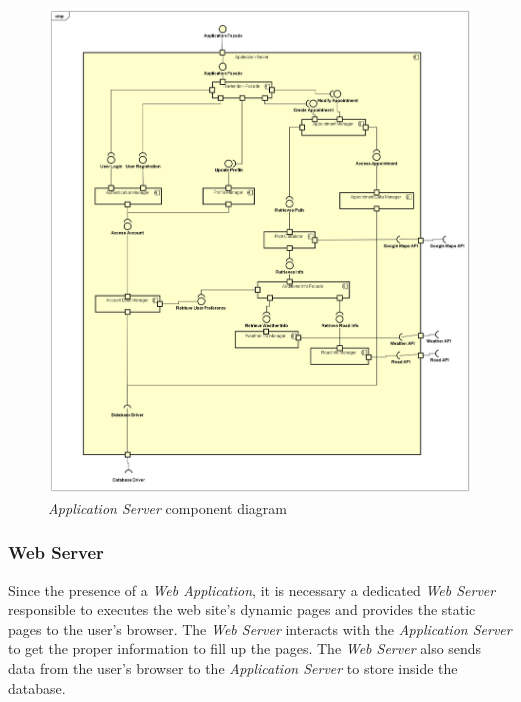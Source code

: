 \begin{figure}
	\includegraphics[width = \textwidth, height = \textheight, keepaspectratio = true]{Img/ApplicationServerCD}
	\caption{\emph{Application Server} component diagram}
	\label{fig:applicationservercomponentCD}
\end{figure}

\subsubsection{Web Server}
Since the presence of a \emph{Web Application}, it is necessary a dedicated \emph{Web Server} responsible to executes the web site’s dynamic pages and provides the static pages to the user’s browser.
The \emph{Web Server} interacts with the \emph{Application Server} to get the proper information to fill up the pages.
The \emph{Web Server} also sends data from the user’s browser to the \emph{Application Server} to store inside the database.

